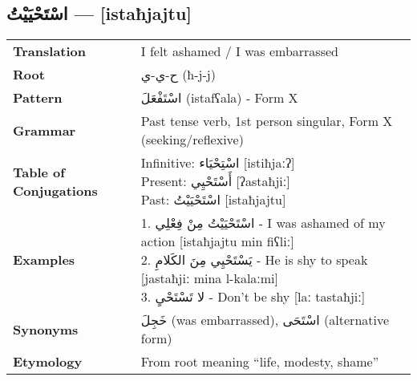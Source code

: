\documentclass[a4paper,12pt]{article}
\begin{document}
\subsection{\textarabic{اسْتَحْيَيْتُ} — [istaħjajtu]}
\begin{tabular}{p{3cm}p{10cm}}
\toprule
\textbf{Translation} & I felt ashamed / I was embarrassed \\
\textbf{Root} & \textarabic{ح-ي-ي} (ħ-j-j) \\
\textbf{Pattern} & \textarabic{اسْتَفْعَلَ} (istafʕala) - Form X \\
\textbf{Grammar} & Past tense verb, 1st person singular, Form X (seeking/reflexive) \\
\textbf{Table of Conjugations} & \makecell[l]{
Infinitive: \textarabic{اسْتِحْيَاء} [istiħjaːʔ] \\
Present: \textarabic{أَسْتَحْيِي} [ʔastaħjiː] \\
Past: \textarabic{اسْتَحْيَيْتُ} [istaħjajtu]
} \\
\textbf{Examples} & \makecell[l]{\parbox{9.5cm}{
1. \textarabic{اسْتَحْيَيْتُ مِنْ فِعْلِي} - I was ashamed of my action [istaħjajtu min fiʕliː]\\
2. \textarabic{يَسْتَحْيِي مِنَ الكَلامِ} - He is shy to speak [jastaħjiː mina l-kalaːmi]\\
3. \textarabic{لا تَسْتَحْيِ} - Don't be shy [laː tastaħjiː]
}} \\
\midrule
\textbf{Synonyms} & \textarabic{خَجِلَ} (was embarrassed), \textarabic{اسْتَحَى} (alternative form) \\
\textbf{Etymology} & From root meaning ``life, modesty, shame'' \\
\bottomrule
\end{tabular}
\end{document}
